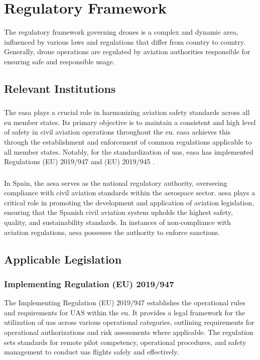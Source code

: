 \chapter{Regulatory Framework}
\label{ch:regulatory_framework}

The regulatory framework governing drones is a complex and dynamic area, influenced by various laws and regulations that differ from country to country. Generally, drone operations are regulated by aviation authorities responsible for ensuring safe and responsible usage.

\section{Relevant Institutions}

\subsection{}
The \gls{easa} \autocite{eu-1139-2018} plays a crucial role in harmonizing aviation safety standards across all \gls{eu} member states. Its primary objective is to maintain a consistent and high level of safety in civil aviation operations throughout the \gls{eu}. \gls{easa} achieves this through the establishment and enforcement of common regulations applicable to all member states. Notably, for the standardization of \gls{uas}, \gls{easa} has implemented Regulations (EU) 2019/947 \autocite{eu-947-2019} and (EU) 2019/945 \autocite{eu-945-2019}.

\subsection{}
In Spain, the \gls{aesa} \autocite{sp-184-2008} serves as the national regulatory authority, overseeing compliance with civil aviation standards within the aerospace sector. \gls{aesa} plays a critical role in promoting the development and application of aviation legislation, ensuring that the Spanish civil aviation system upholds the highest safety, quality, and sustainability standards. In instances of non-compliance with aviation regulations, \gls{aesa} possesses the authority to enforce sanctions.

\section{Applicable Legislation}

\subsection{Implementing Regulation (EU) 2019/947}
The Implementing Regulation (EU) 2019/947 \autocite{eu-947-2019} establishes the operational rules and requirements for UAS within the \gls{eu}. It provides a legal framework for the utilization of \gls{uas} across various operational categories, outlining requirements for operational authorizations and risk assessments where applicable. The regulation sets standards for remote pilot competency, operational procedures, and safety management to conduct \gls{uas} flights safely and effectively.

